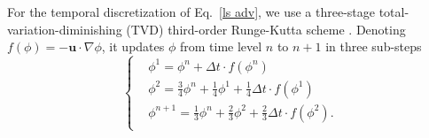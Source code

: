 \sloppy
For the temporal discretization of Eq.\ \eqref{ls adv}, we use a three-stage total-variation-diminishing (TVD) third-order Runge-Kutta scheme \citep{Shu_JCP_1988}. Denoting $f(\phi)=-{\bm u} \cdot \nabla \phi$, it updates $\phi$ from time level $n$ to $n+1$ in three sub-steps
\begin{equation}
  \begin{cases}
    & \phi^1 = \phi^n + \Delta t \cdot f(\phi^n)  \\
    & \phi^2 = \frac{3}{4} \phi^n + \frac{1}{4} \phi^1 + \frac{1}{4} \Delta t \cdot f(\phi^1) \\
    & \phi^{n+1} = \frac{1}{3} \phi^n + \frac{2}{3} \phi^2 + \frac{2}{3} \Delta t \cdot f(\phi^2). \\
  \end{cases}
  \label{SSP-RK3}
\end{equation}

